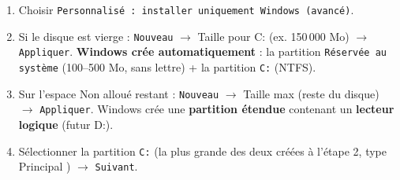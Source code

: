 \documentclass[11pt]{article}
\begin{document}
\begin{methode}
\begin{enumerate}
  \item Choisir \texttt{Personnalisé : installer uniquement Windows (avancé)}.
  \item Si le disque est vierge : \texttt{Nouveau} $\rightarrow$ Taille pour C: (ex. 150\,000 Mo) $\rightarrow$ \texttt{Appliquer}. \textbf{Windows crée automatiquement} : la partition \texttt{Réservée au système} (100--500 Mo, sans lettre) + la partition \texttt{C:} (NTFS).
  \item Sur l'espace \og Non alloué \fg{} restant : \texttt{Nouveau} $\rightarrow$ Taille max (reste du disque) $\rightarrow$ \texttt{Appliquer}. Windows crée une \textbf{partition étendue} contenant un \textbf{lecteur logique} (futur D:).
  \item Sélectionner la partition \texttt{C:} (la plus grande des deux créées à l'étape 2, type \og Principal \fg{}) $\rightarrow$ \texttt{Suivant}.
\end{enumerate}
\end{methode}
\end{document}

